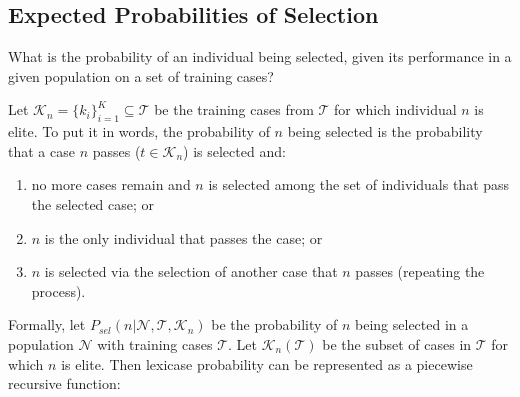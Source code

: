\documentclass[preprint]{article}
\newcommand*\Let[2]{\State #1 $\gets$ #2}
\begin{document}


\begin{table}

\end{table}
\subsection{Expected Probabilities of Selection}
What is the probability of an individual being selected, given its performance in a given population on a set of training cases?  

Let $\mathcal{K}_n = \{k_i\}_{i=1}^K \subseteq \mathcal{T}$ be the training cases from $\mathcal{T}$ for which individual $n$ is elite. To put it in words, the probability of $n$ being selected is the probability that a case $n$ passes ($t \in \mathcal{K}_n$) is selected and: \begin{enumerate} \item no more cases remain and $n$ is selected among the set of individuals that pass the selected case; or \item $n$ is the only individual that passes the case; or \item $n$ is selected via the selection of another case that $n$ passes (repeating the process). \end{enumerate} 

Formally, let $P_{sel}(n | \mathcal{N}, \mathcal{T}, \mathcal{K}_n)$ be the probability of $n$ being selected in a population $\mathcal{N}$ with training cases $\mathcal{T}$. Let $\mathcal{K}_n(\mathcal{T})$ be the subset of cases in $\mathcal{T}$ for which $n$ is elite. Then lexicase probability can be represented as a piecewise recursive function: 
\end{document}
